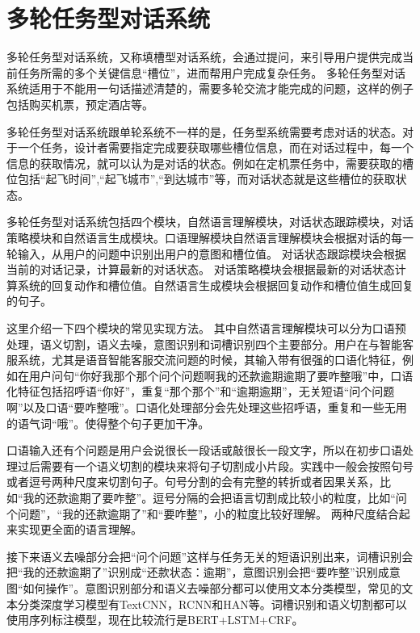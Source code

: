 \section{多轮任务型对话系统}
多轮任务型对话系统\cite{young2013pomdp}，又称填槽型对话系统，会通过提问，来引导用户提供完成当前任务所需的多个关键信息``槽位''，进而帮用户完成复杂任务。
多轮任务型对话系统适用于不能用一句话描述清楚的，需要多轮交流才能完成的问题，这样的例子包括购买机票，预定酒店等。

多轮任务型对话系统跟单轮系统不一样的是，任务型系统需要考虑对话的状态。对于一个任务，设计者需要指定完成要获取哪些槽位信息，而在对话过程中，每一个信息的获取情况，就可以认为是对话的状态。例如在定机票任务中，需要获取的槽位包括``起飞时间'',``起飞城市'',``到达城市''等，而对话状态就是这些槽位的获取状态。

多轮任务型对话系统包括四个模块，自然语言理解模块，对话状态跟踪模块，对话策略模块和自然语言生成模块。口语理解模块自然语言理解模块会根据对话的每一轮输入，从用户的问题中识别出用户的意图和槽位值。
对话状态跟踪模块会根据当前的对话记录，计算最新的对话状态。 对话策略模块会根据最新的对话状态计算系统的回复动作和槽位值。自然语言生成模块会根据回复动作和槽位值生成回复的句子。

这里介绍一下四个模块的常见实现方法。
其中自然语言理解模块可以分为口语预处理，语义切割，语义去噪，意图识别和词槽识别四个主要部分。用户在与智能客服系统，尤其是语音智能客服交流问题的时候，其输入带有很强的口语化特征，例如在用户问句“你好我那个那个问个问题啊我的还款逾期逾期了要咋整哦”中，口语化特征包括招呼语“你好”，重复“那个那个”和“逾期逾期”，无关短语“问个问题啊”以及口语“要咋整哦”。口语化处理部分会先处理这些招呼语，重复和一些无用的语气词“哦”。使得整个句子更加干净。

口语输入还有个问题是用户会说很长一段话或敲很长一段文字，所以在初步口语处理过后需要有一个语义切割的模块来将句子切割成小片段。实践中一般会按照句号或者逗号两种尺度来切割句子。句号分割的会有完整的转折或者因果关系，比如“我的还款逾期了要咋整”。逗号分隔的会把语言切割成比较小的粒度，比如“问个问题”，“我的还款逾期了”和“要咋整”，小的粒度比较好理解。 两种尺度结合起来实现更全面的语言理解。

接下来语义去噪部分会把“问个问题”这样与任务无关的短语识别出来，词槽识别会把“我的还款逾期了”识别成“还款状态：逾期”，意图识别会把“要咋整”识别成意图“如何操作”。意图识别部分和语义去噪部分都可以使用文本分类模型，常见的文本分类深度学习模型有TextCNN\cite{kim-2014-convolutional}，RCNN\cite{lai2015recurrent}和HAN\cite{yang2016hierarchical}等。词槽识别和语义切割都可以使用序列标注模型，现在比较流行是BERT+LSTM+CRF。

